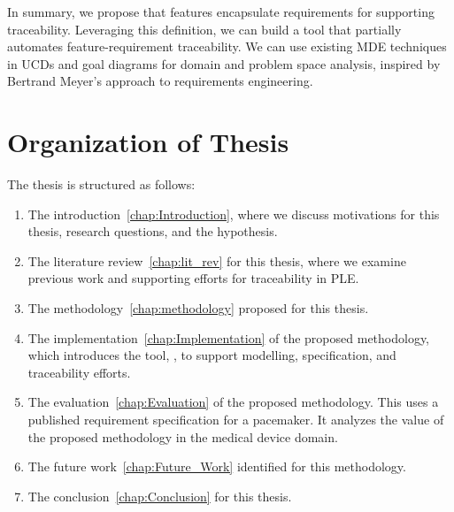 In summary, we propose that features encapsulate requirements for supporting traceability. Leveraging this definition, we can build a tool that partially automates feature-requirement traceability. We can use existing \gls{MDE} techniques in \gls{UCD}s and goal diagrams for domain and problem space analysis, inspired by Bertrand Meyer's approach to requirements engineering.

\section{Organization of Thesis}

The thesis is structured as follows:
\begin{enumerate}[label=\textbf{Chapter \arabic*:}]
	\item The introduction~\ref{chap:Introduction}, where we discuss motivations for this thesis, research questions, and the hypothesis.
	\item The literature review~\ref{chap:lit_rev} for this thesis, where we examine previous work and supporting efforts for traceability in \gls{PLE}.
	\item The methodology~\ref{chap:methodology} proposed for this thesis.
	\item The implementation~\ref{chap:Implementation} of the proposed methodology, which introduces the tool, \tool, to support modelling, specification, and traceability efforts.
	\item The evaluation~\ref{chap:Evaluation} of the proposed methodology. This uses a published requirement specification for a pacemaker. It analyzes the value of the proposed methodology in the medical device domain.
	\item The future work~\ref{chap:Future_Work} identified for this methodology.
	\item The conclusion~\ref{chap:Conclusion} for this thesis.
\end{enumerate}








